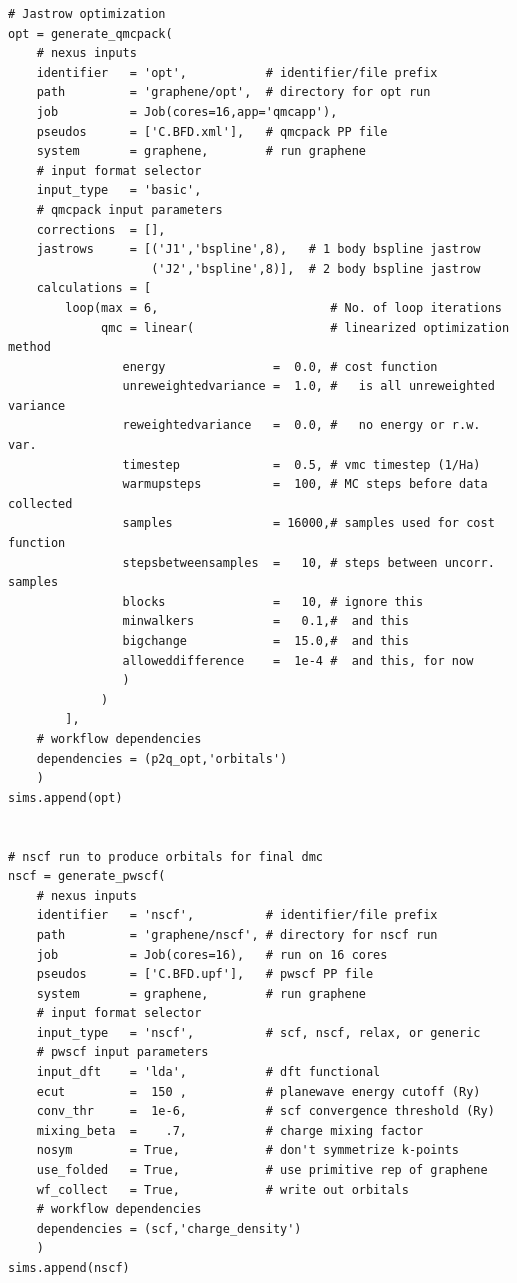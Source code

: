 \documentclass[oneside,11pt]{memoir}
\numberwithin{equation}{section}
\begin{document}
\begin{verbatim}
# Jastrow optimization
opt = generate_qmcpack(
    # nexus inputs
    identifier   = 'opt',           # identifier/file prefix
    path         = 'graphene/opt',  # directory for opt run
    job          = Job(cores=16,app='qmcapp'),
    pseudos      = ['C.BFD.xml'],   # qmcpack PP file
    system       = graphene,        # run graphene
    # input format selector   
    input_type   = 'basic',
    # qmcpack input parameters
    corrections  = [], 
    jastrows     = [('J1','bspline',8),   # 1 body bspline jastrow
                    ('J2','bspline',8)],  # 2 body bspline jastrow
    calculations = [
        loop(max = 6,                        # No. of loop iterations
             qmc = linear(                   # linearized optimization method
                energy               =  0.0, # cost function
                unreweightedvariance =  1.0, #   is all unreweighted variance
                reweightedvariance   =  0.0, #   no energy or r.w. var. 
                timestep             =  0.5, # vmc timestep (1/Ha)
                warmupsteps          =  100, # MC steps before data collected 
                samples              = 16000,# samples used for cost function 
                stepsbetweensamples  =   10, # steps between uncorr. samples
                blocks               =   10, # ignore this  
                minwalkers           =   0.1,#  and this
                bigchange            =  15.0,#  and this
                alloweddifference    =  1e-4 #  and this, for now
                )
             )        
        ],
    # workflow dependencies
    dependencies = (p2q_opt,'orbitals')        
    )
sims.append(opt)


# nscf run to produce orbitals for final dmc
nscf = generate_pwscf(
    # nexus inputs
    identifier   = 'nscf',          # identifier/file prefix      
    path         = 'graphene/nscf', # directory for nscf run       
    job          = Job(cores=16),   # run on 16 cores             
    pseudos      = ['C.BFD.upf'],   # pwscf PP file               
    system       = graphene,        # run graphene                
    # input format selector                                      
    input_type   = 'nscf',          # scf, nscf, relax, or generic
    # pwscf input parameters
    input_dft    = 'lda',           # dft functional
    ecut         =  150 ,           # planewave energy cutoff (Ry)
    conv_thr     =  1e-6,           # scf convergence threshold (Ry)
    mixing_beta  =    .7,           # charge mixing factor
    nosym        = True,            # don't symmetrize k-points
    use_folded   = True,            # use primitive rep of graphene
    wf_collect   = True,            # write out orbitals
    # workflow dependencies
    dependencies = (scf,'charge_density')
    )
sims.append(nscf)


\end{verbatim}
\end{document}
